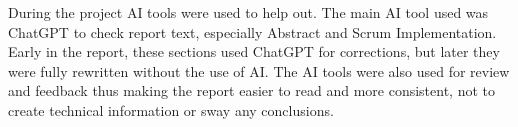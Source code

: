 
During the project AI tools were used to help out. The main AI tool used was ChatGPT to check report text, especially Abstract and Scrum Implementation. Early in the report, these sections used ChatGPT for corrections, but later they were fully rewritten without the use of AI. The AI tools were also used for review and feedback thus making the report easier to read and more consistent, not to create technical information or sway any conclusions.
